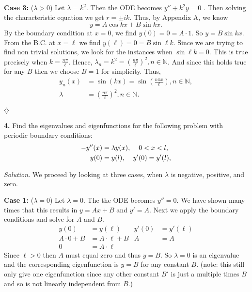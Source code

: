 \documentclass{article}
\begin{document}
\vspace{2mm}
\textbf{Case 3:} (\( \lambda >0\)) Let \(\lambda = k^2 \). Then the ODE becomes \( y''+k^2y = 0\) . Then solving the characteristic equation we get \(r= \pm ik\). Thus, by Appendix A, we know 
\[
y= A\cos kx + B \sin kx.
\]
By the boundary condition at \(x=0\), we find \(y(0)=0= A \cdot 1\). So \(y= B\sin kx\). From the B.C. at \(x=\ell\) we find \(y(\ell) = 0= B \sin \ell k \). Since we are trying to find non trivial solutions, we look for the instances when \(\sin \ell k=0\). This is true precisely when \(k=\frac{n\pi}{\ell}\). Hence, \(\lambda_n = k^2=(\frac{n\pi}{\ell})^2 , n\in \mathbb{N}  \). And since this holds true for any \(B\) then we choose \(B=1\) for simplicity. Thus, 
\begin{align*}
 y_n(x) &=\sin(kx)= \sin \left( \frac{n\pi x}{\ell}\right),  n\in \mathbb{N},\\
 \lambda &= \left(\frac{n\pi}{\ell}\right)^2, n\in \mathbb{N} .
\end{align*}



\begin{flushright}
\( \diamondsuit \)
\end{flushright}



\newpage
\textbf{4.} Find the eigenvalues and eigenfunctions for the following problem with periodic boundary conditions:
\begin{align*}
-y''(x) &= \lambda y(x), \hspace{4mm} 0<x<l, \\
y(0)&=y(l),\hspace{4mm} y'(0)=y'(l), 
\end{align*}





\vspace{3mm}
\textit{Solution.} We proceed by looking at three cases, when \(\lambda \) is negative, positive, and zero.

\vspace{2mm}
\textbf{Case 1:} (\(\lambda =0\)) Let \(\lambda =0\). The the ODE becomes \(y''=0\). We have shown many times that this results in \(y=Ax+B\) and \(y'=A\). Next we apply the boundary conditions and solve for \(A\) and \(B\). 
\begin{align*}
y(0) &= y(\ell)  &    y'(0) &= y'(\ell) \\
A\cdot 0 +B&=  A\cdot \ell + B & A&=A   \\
0&=A \cdot \ell & &
\end{align*}
Since \(\ell >0\) then \(A\) must equal zero and thus \(y=B\). So \(\lambda=0\) is an eigenvalue and the corresponding eigenfunction is \(y=B\) for any constant \(B\). (note: this still only give one eigenfunction since any other constant \(B'\) is just a multiple times \(B\) and so is not linearly independent from \(B\).) 
\end{document}
